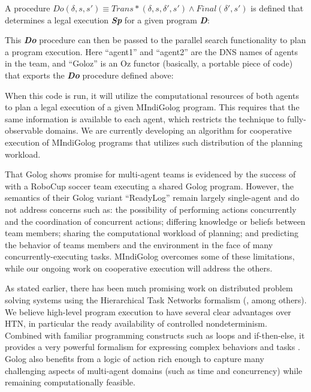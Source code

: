 \documentclass[times, 10pt, twocolumn]{article}
\begin{document}
A procedure $Do(\delta,s,s')\equiv Trans*(\delta,s,\delta',s')\wedge Final(\delta',s')$
is defined that determines a legal execution \textbf{\emph{Sp}} for
a given program \textbf{\emph{D}}:

{\small  }{\small \par}

This \textbf{\emph{Do}} procedure can then be passed to the parallel
search functionality to plan a program execution. Here {}``agent1''
and {}``agent2'' are the DNS names of agents in the team, and {}``Goloz''
is an Oz functor (basically, a portable piece of code) that exports
the \textbf{\emph{Do}} procedure defined above:

{\small  }{\small \par}

When this code is run, it will utilize the computational resources
of both agents to plan a legal execution of a given MIndiGolog program.
This requires that the same information is available to each agent,
which restricts the technique to fully-observable domains. We are
currently developing an algorithm for cooperative execution of MIndiGolog
programs that utilizes such distribution of the planning workload.



That Golog shows promise for multi-agent teams is evidenced by the
success of \cite{Ferrein2005readylog} with a RoboCup soccer team
executing a shared Golog program. However, the semantics of their
Golog variant {}``ReadyLog'' remain largely single-agent and do
not address concerns such as: the possibility of performing actions
concurrently and the coordination of concurrent actions; differing
knowledge or beliefs between team members; sharing the computational
workload of planning; and predicting the behavior of teams members
and the environment in the face of many concurrently-executing tasks.
MIndiGolog overcomes some of these limitations, while our ongoing
work on cooperative execution will address the others.

As stated earlier, there has been much promising work on distributed
problem solving systems using the Hierarchical Task Networks formalism
(\cite{tambe97flexible_teamwork,decker95designing_coordination,grosz99planning_together},
among others). We believe high-level program execution to have several
clear advantages over HTN, in particular the ready availability of
controlled nondeterminism. Combined with familiar programming constructs
such as loops and if-then-else, it provides a very powerful formalism
for expressing complex behaviors and tasks \cite{Gabaldon02htn_in_golog,son00htn_golog}.
Golog also benefits from a logic of action rich enough to capture
many challenging aspects of multi-agent domains (such as time and
concurrency) while remaining computationally feasible.
\end{document}
